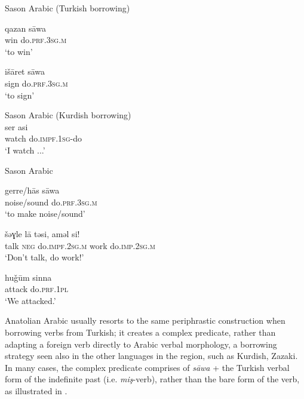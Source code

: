 \documentclass[output=paper]{langsci/langscibook}
\begin{document}
\begin{exe}
\ex \label{l} Sason Arabic (Turkish borrowing) 
		\begin{xlist}
			\ex \label{ltk2} \gll qazan 	s\={a}wa  \\
        win	do.\textsc{prf.3sg.m}\\
        \glt `to win'
		
		\ex \label{ltk1}\gll išāret s\={a}wa \\
    sign  do.\textsc{prf.3sg.m}\\
        \glt `to sign'



		\end{xlist}
        
      \ex \label{l3} Sason Arabic (Kurdish borrowing) \\
      \gll ser asi \\
        watch do.\textsc{impf.1sg}-do\\
        \glt `I watch ...'
        
        
        \ex \label{lar} Sason Arabic \\
		\begin{xlist}
		\ex \gll gerre/h\={a}s s\={a}wa\\
    noise/sound do.\textsc{prf.3sg.m}\\
        \glt `to make noise/sound'


	\ex \label{lar2} \gll šəɣle l\={a} təsi, aməl si!  \\
      talk \textsc{neg} do.\textsc{impf.2sg.m} work do.\textsc{imp.2sg.m}\\
        \glt `Don't talk, do work!'
        
        \ex \label{lar3}\gll hu\v{g}ūm sinna \\
    attack  do.\textsc{prf.1pl}\\
        \glt `We attacked.'
		\end{xlist}
        
\end{exe}

\noindent Anatolian Arabic usually resorts to the same periphrastic construction when borrowing verbs from Turkish; it creates a complex predicate, rather than adapting a foreign verb directly to Arabic verbal morphology, a borrowing strategy seen also in the other languages in the region, such as Kurdish, Zazaki. In many cases, the complex predicate comprises of \textit{s\={a}wa} + the Turkish verbal form of the indefinite past (i.e. \textit{mi\c{s}}-verb), rather than the bare form of the verb, as illustrated in .
\end{document}
